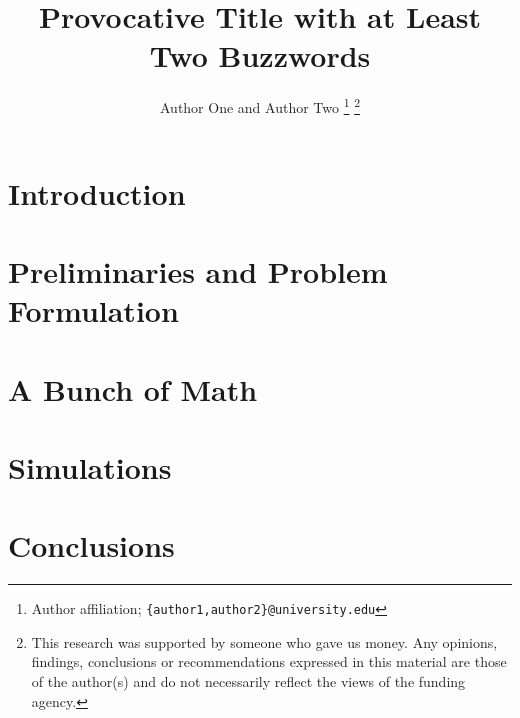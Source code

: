 \documentclass[letterpaper, 10 pt, conference]{ieeeconf}
\title{\textbf{Provocative Title with at Least Two Buzzwords}}
\author{Author One and Author Two %
\thanks{Author affiliation; \texttt{\{author1,author2\}@university.edu}}
\thanks{This research was supported by someone who gave us money. Any opinions, findings, conclusions or recommendations expressed in this material are those of the author(s) and do not necessarily reflect the views of the funding agency.}
}
\begin{document}
\maketitle
\begin{abstract}
    \blindtext
\end{abstract}

\section{Introduction}
\blindtext[8]

\cite{Example}

\section{Preliminaries and Problem Formulation}
\blindtext

\begin{definition}
    \blindtext
\end{definition}

\section{A Bunch of Math}

\section{Simulations}

\section{Conclusions}



\end{document}
